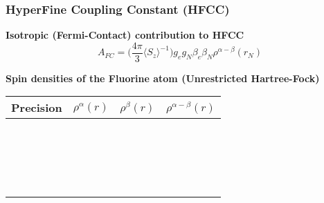 \begin{frame}
\frametitle{HyperFine Coupling Constant (HFCC)}
\centering
\scriptsize
\textbf{Isotropic (Fermi-Contact) contribution to HFCC}
\begin{equation}
    \nonumber
    A_{FC} = \Big(\frac{4\pi}{3}\langle S_z \rangle^{-1}\Big)
    g_eg_N\beta_e\beta_N\rho^{\alpha-\beta}(r_N)
\end{equation}
\begin{table}
\textbf{Spin densities of the Fluorine atom (Unrestricted Hartree-Fock)}
\begin{tabular}{crrr}
\hline
\hline
\multicolumn{1}{c}{\textbf{Precision}}&
\multicolumn{1}{c}{$\rho^\alpha(r)$}&
\multicolumn{1}{c}{$\rho^\beta(r)$}&
\multicolumn{1}{c}{$\rho^{\alpha-\beta}(r)$}\\
\hline
\hspace{10mm}\     & \hspace{18mm}\     & \hspace{18mm}\     & \hspace{15mm}\ \\
                   &                    &                    &                \\
                   &                    &                    &                \\
                   &                    &                    &                \\
                   &                    &                    &                \\
                   &                    &                    &                \\
                   &                    &                    &                \\
                   &                    &                    &                \\
                   &                    &                    &                \\
                   &                    &                    &                \\
                   &                    &                    &                \\
                   &                    &                    &                \\
                   &                    &                    &                \\
                   &                    &                    &                \\
                   &                    &                    &                \\
\hline
\hline
\end{tabular}
\end{table}
\end{frame}

